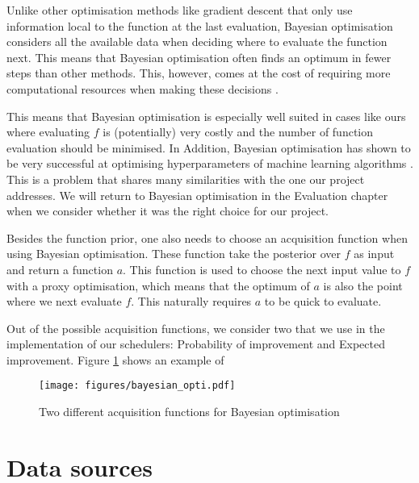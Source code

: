 \documentclass[a4paper,12pt,twoside,openright]{report}
\begin{document}
Unlike other optimisation methods like gradient descent that only use information local to the function at the last evaluation, Bayesian optimisation considers all the available data when deciding where to evaluate the function next. This means that Bayesian optimisation often finds an optimum in fewer steps than other methods. This, however, comes at the cost of requiring more computational resources when making these decisions \cite{PracticalBayesianOptimization}.

This means that Bayesian optimisation is especially well suited in cases like ours where evaluating $f$ is (potentially) very costly and the number of function evaluation should be minimised. In Addition, Bayesian optimisation has shown to be very successful at optimising hyperparameters of machine learning algorithms \cite{PracticalBayesianOptimization}. This is a problem that shares many similarities with the one our project addresses. We will return to Bayesian optimisation in the Evaluation chapter when we consider whether it was the right choice for our project.

Besides the function prior, one also needs to choose an acquisition function when using Bayesian optimisation. These function take the posterior over $f$ as input and return a function $a$. This function is used to choose the next input value to $f$ with a proxy optimisation, which means that the optimum of $a$ is also the point where we next evaluate $f$. This naturally requires $a$ to be quick to evaluate.

Out of the possible acquisition functions, we consider two that we use in the implementation of our schedulers: Probability of improvement and Expected improvement. Figure \ref{bayesianopti} shows an example of 

\begin{figure}
\centering
  \texttt{[image: figures/bayesian\_opti.pdf]}
  \caption{Two different acquisition functions for Bayesian optimisation}
  \label{bayesianopti}
\end{figure}




\section{Data sources}
\end{document}
